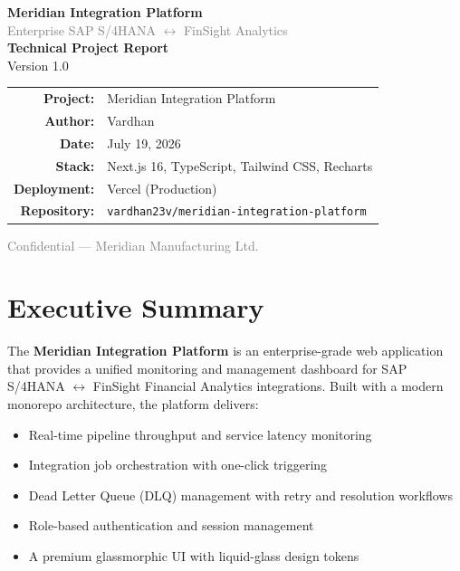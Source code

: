 \documentclass[12pt,a4paper]{article}
\begin{document}
\begin{titlepage}
\centering
\vspace*{3cm}

{\Huge\bfseries\textcolor{meridian}{Meridian Integration Platform}}\\[0.8cm]
{\Large\textcolor{gray}{Enterprise SAP S/4HANA $\leftrightarrow$ FinSight Analytics}}\\[2cm]

{\large\bfseries Technical Project Report}\\[0.5cm]
{\large Version 1.0}\\[2cm]

\begin{tabular}{rl}
\textbf{Project:} & Meridian Integration Platform \\
\textbf{Author:}  & Vardhan \\
\textbf{Date:}    & July 19, 2026 \\
\textbf{Stack:}   & Next.js 16, TypeScript, Tailwind CSS, Recharts \\
\textbf{Deployment:} & Vercel (Production) \\
\textbf{Repository:} & \texttt{vardhan23v/meridian-integration-platform} \\
\end{tabular}

\vfill
{\small\textcolor{gray}{Confidential --- Meridian Manufacturing Ltd.}}
\end{titlepage}

\tableofcontents
\newpage

\section{Executive Summary}

The \textbf{Meridian Integration Platform} is an enterprise-grade web application that provides a unified monitoring and management dashboard for SAP S/4HANA $\leftrightarrow$ FinSight Financial Analytics integrations. Built with a modern monorepo architecture, the platform delivers:

\begin{itemize}[leftmargin=2em]
  \item Real-time pipeline throughput and service latency monitoring
  \item Integration job orchestration with one-click triggering
  \item Dead Letter Queue (DLQ) management with retry and resolution workflows
  \item Role-based authentication and session management
  \item A premium glassmorphic UI with liquid-glass design tokens
\end{itemize}
\end{document}
